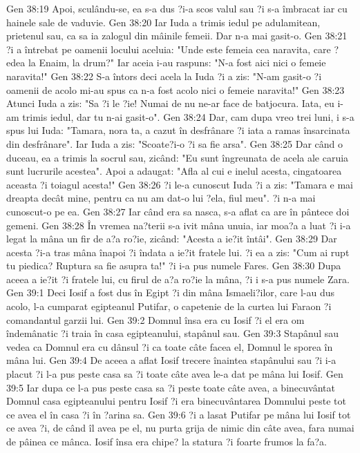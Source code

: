 Gen 38:19  Apoi, sculându-se, ea s-a dus ?i-a scos valul sau ?i s-a îmbracat iar cu hainele sale de vaduvie.
Gen 38:20  Iar Iuda a trimis iedul pe adulamitean, prietenul sau, ca sa ia zalogul din mâinile femeii. Dar n-a mai gasit-o.
Gen 38:21  ?i a întrebat pe oamenii locului aceluia: "Unde este femeia cea naravita, care ?edea la Enaim, la drum?" Iar aceia i-au raspuns: "N-a fost aici nici o femeie naravita!"
Gen 38:22  S-a întors deci acela la Iuda ?i a zis: "N-am gasit-o ?i oamenii de acolo mi-au spus ca n-a fost acolo nici o femeie naravita!"
Gen 38:23  Atunci Iuda a zis: "Sa ?i le ?ie! Numai de nu ne-ar face de batjocura. Iata, eu i-am trimis iedul, dar tu n-ai gasit-o".
Gen 38:24  Dar, cam dupa vreo trei luni, i s-a spus lui Iuda: "Tamara, nora ta, a cazut în desfrânare ?i iata a ramas însarcinata din desfrânare". Iar Iuda a zis: "Scoate?i-o ?i sa fie arsa".
Gen 38:25  Dar când o duceau, ea a trimis la socrul sau, zicând: "Eu sunt îngreunata de acela ale caruia sunt lucrurile acestea". Apoi a adaugat: "Afla al cui e inelul acesta, cingatoarea aceasta ?i toiagul acesta!"
Gen 38:26  ?i le-a cunoscut Iuda ?i a zis: "Tamara e mai dreapta decât mine, pentru ca nu am dat-o lui ?ela, fiul meu". ?i n-a mai cunoscut-o pe ea.
Gen 38:27  Iar când era sa nasca, s-a aflat ca are în pântece doi gemeni.
Gen 38:28  În vremea na?terii s-a ivit mâna unuia, iar moa?a a luat ?i i-a legat la mâna un fir de a?a ro?ie, zicând: "Acesta a ie?it întâi".
Gen 38:29  Dar acesta ?i-a tras mâna înapoi ?i îndata a ie?it fratele lui. ?i ea a zis: "Cum ai rupt tu piedica? Ruptura sa fie asupra ta!" ?i i-a pus numele Fares.
Gen 38:30  Dupa aceea a ie?it ?i fratele lui, cu firul de a?a ro?ie la mâna, ?i i s-a pus numele Zara.
Gen 39:1  Deci Iosif a fost dus în Egipt ?i din mâna Ismaeli?ilor, care l-au dus acolo, l-a cumparat egipteanul Putifar, o capetenie de la curtea lui Faraon ?i comandantul garzii lui.
Gen 39:2  Domnul însa era cu Iosif ?i el era om îndemânatic ?i traia în casa egipteanului, stapânul sau.
Gen 39:3  Stapânul sau vedea ca Domnul era cu dânsul ?i ca toate câte facea el, Domnul le sporea în mâna lui.
Gen 39:4  De aceea a aflat Iosif trecere înaintea stapânului sau ?i i-a placut ?i l-a pus peste casa sa ?i toate câte avea le-a dat pe mâna lui Iosif.
Gen 39:5  Iar dupa ce l-a pus peste casa sa ?i peste toate câte avea, a binecuvântat Domnul casa egipteanului pentru Iosif ?i era binecuvântarea Domnului peste tot ce avea el în casa ?i în ?arina sa.
Gen 39:6  ?i a lasat Putifar pe mâna lui Iosif tot ce avea ?i, de când îl avea pe el, nu purta grija de nimic din câte avea, fara numai de pâinea ce mânca. Iosif însa era chipe? la statura ?i foarte frumos la fa?a.

